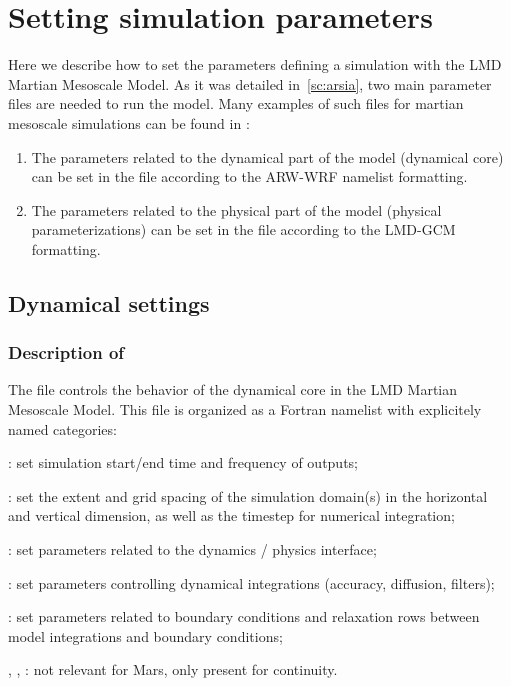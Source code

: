 \chapter{Setting simulation parameters}\label{zeparam}

\vk
Here we describe how to set the parameters defining a simulation with the LMD Martian Mesoscale Model. As it was detailed in~\ref{sc:arsia}, two main parameter files are needed to run the model. Many examples of such files for martian mesoscale simulations can be found in :
\begin{enumerate}
\item The parameters related to the dynamical part of the model (dynamical core) can be set in the file  according to the ARW-WRF namelist formatting.
\item The parameters related to the physical part of the model (physical parameterizations) can be set in the file  according to the LMD-GCM formatting.
\end{enumerate}

\mk
\section{Dynamical settings}

\sk
\subsection{Description of }

\sk
The file  controls the behavior of the dynamical core in the LMD Martian Mesoscale Model. This file is organized as a Fortran namelist with explicitely named categories:
\begin{citemize}
\item {}: set simulation start/end time and frequency of outputs;
\item {}: set the extent and grid spacing of the simulation domain(s) in the horizontal and vertical dimension, as well as the timestep for numerical integration;
\item {}: set parameters related to the dynamics / physics interface;
\item {}: set parameters controlling dynamical integrations (accuracy, diffusion, filters);
\item {}: set parameters related to boundary conditions and relaxation rows between model integrations and boundary conditions;
\item {}, , : not relevant for Mars, only present for continuity.
\end{citemize}


